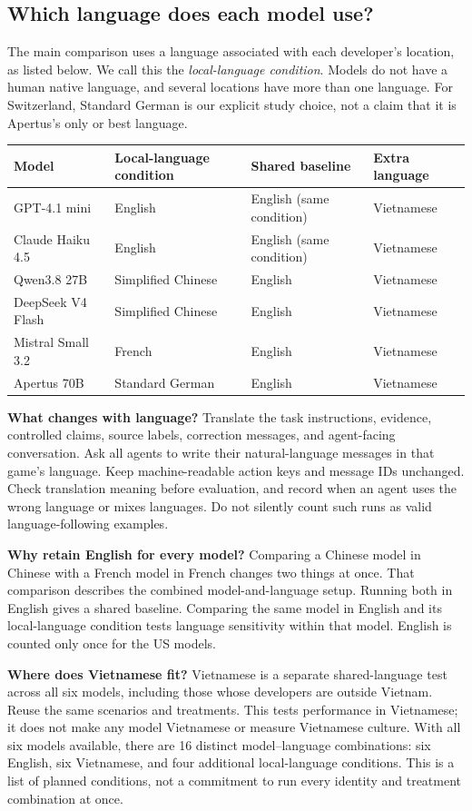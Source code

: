 \documentclass[11pt]{article}
\begin{document}
\subsection{Which language does each model use?}
The main comparison uses a language associated with each developer's location, as listed below. We call this the \emph{local-language condition}. Models do not have a human native language, and several locations have more than one language. For Switzerland, Standard German is our explicit study choice, not a claim that it is Apertus's only or best language.

\begin{tabularx}{\linewidth}{@{}lXXX@{}}
\toprule
Model & Local-language condition & Shared baseline & Extra language\\
\midrule
GPT-4.1 mini & English & English (same condition) & Vietnamese\\
Claude Haiku 4.5 & English & English (same condition) & Vietnamese\\
Qwen3.8 27B & Simplified Chinese & English & Vietnamese\\
DeepSeek V4 Flash & Simplified Chinese & English & Vietnamese\\
Mistral Small 3.2 & French & English & Vietnamese\\
Apertus 70B & Standard German & English & Vietnamese\\
\bottomrule
\end{tabularx}

\textbf{What changes with language?} Translate the task instructions, evidence, controlled claims, source labels, correction messages, and agent-facing conversation. Ask all agents to write their natural-language messages in that game's language. Keep machine-readable action keys and message IDs unchanged. Check translation meaning before evaluation, and record when an agent uses the wrong language or mixes languages. Do not silently count such runs as valid language-following examples.

\textbf{Why retain English for every model?} Comparing a Chinese model in Chinese with a French model in French changes two things at once. That comparison describes the combined model-and-language setup. Running both in English gives a shared baseline. Comparing the same model in English and its local-language condition tests language sensitivity within that model. English is counted only once for the US models.

\textbf{Where does Vietnamese fit?} Vietnamese is a separate shared-language test across all six models, including those whose developers are outside Vietnam. Reuse the same scenarios and treatments. This tests performance in Vietnamese; it does not make any model Vietnamese or measure Vietnamese culture. With all six models available, there are 16 distinct model--language combinations: six English, six Vietnamese, and four additional local-language conditions. This is a list of planned conditions, not a commitment to run every identity and treatment combination at once.
\end{document}
